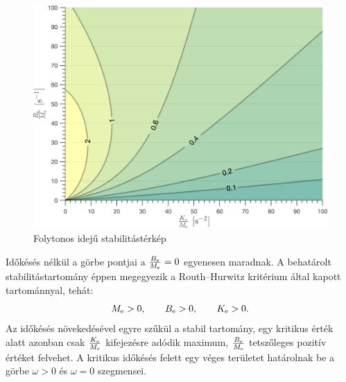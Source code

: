 \begin{figure}[H]
    \begin{center}
    \includegraphics[width=\textwidth]{images/time_delay_stab_map.png}
    \caption{Folytonos idejű stabilitástérkép}\label{fig:time_delay_stab_map}
    \end{center}
\end{figure}

Időkésés nélkül a görbe pontjai a \(\frac{B_{\mathrm{e}}}{M_{\mathrm{e}}} = 0\) egyenesen maradnak.
A behatárolt stabilitástartomány éppen megegyezik a Routh--Hurwitz kritérium által 
kapott tartománnyal, tehát:
\begin{equation}
    M_{\mathrm{e}} > 0,\qquad B_{\mathrm{e}} > 0,\qquad K_{\mathrm{e}} > 0.
\end{equation}
Az időkésés növekedésével egyre szűkül a stabil tartomány, egy kritikus érték alatt azonban
csak \(\frac{K_{\mathrm{e}}}{M_{\mathrm{e}}}\) kifejezésre adódik maximum, \(\frac{B_{\mathrm{e}}}{M_{\mathrm{e}}}\)
tetszőleges pozitív értéket felvehet. A kritikus időkésés felett egy véges területet határolnak be 
a görbe \(\omega > 0\) és \(\omega = 0\) szegmensei. 

